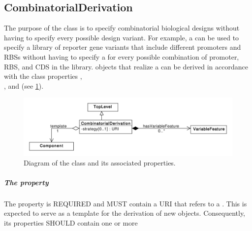 \subsection{CombinatorialDerivation}
\label{sec:CombinatorialDerivation}

The purpose of the  class is to specify combinatorial biological designs without having to specify every possible design variant. For example, a  can be used to specify a library of reporter gene variants that include different promoters and RBSs without having to specify a  for every possible combination of promoter, RBS, and CDS in the library.  objects that realize a  can be derived in accordance with the class properties , \\
 , and  (see \ref{uml:combinatorial_derivation}).

\begin{figure}[ht]
\begin{center}
\includegraphics[scale=0.6]{uml/combinatorial_derivation}
\caption[]{Diagram of the  class and its associated properties.}
\label{uml:combinatorial_derivation}
\end{center}
\end{figure}

\subparagraph{The  property}\label{sec:template}

The  property is REQUIRED and MUST contain a URI that refers to a . 
This  is expected to serve as a template for the derivation of new  objects. 
Consequently, its  properties SHOULD contain one or more  


